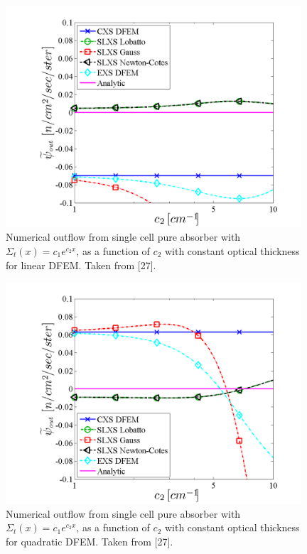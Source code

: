\begin{figure}[!htp]
\centering
\includegraphics[width=11cm]{chapter3_variable_xs/Exp_outflow_p1.png}
\caption{Numerical outflow from single cell pure absorber with $\Sigma_t(x) = c_1e^{c_2 x}$, as a function of $c_2$ with constant optical thickness for linear DFEM.  Taken from [27].}
\label{fig:exp_outflow_p1}
\end{figure}
%
%
\begin{figure}[!hbp]
\centering
\includegraphics[width=11cm]{chapter3_variable_xs/Exp_outflow_p2.png}
\caption{Numerical outflow from single cell pure absorber with $\Sigma_t(x) = c_1e^{c_2 x}$, as a function of $c_2$ with constant optical thickness for quadratic DFEM.  Taken from [27].}
\label{fig:exp_outflow_p2}
\end{figure}
%
